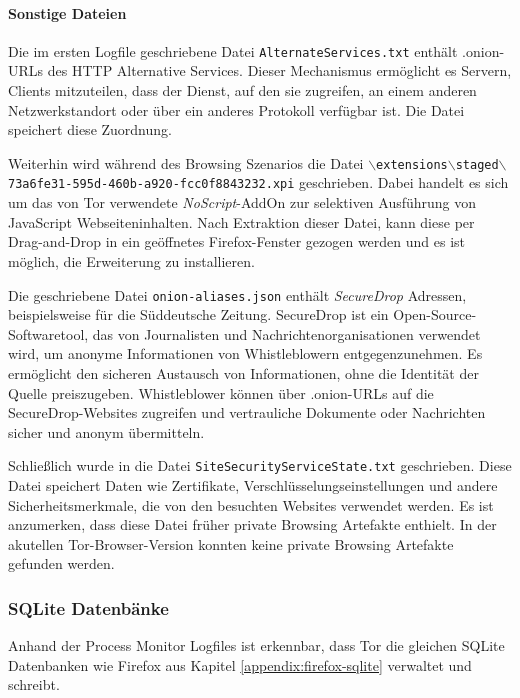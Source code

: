 \begin{appendices}
\paragraph*{Sonstige Dateien}
Die im ersten Logfile geschriebene Datei \texttt{AlternateServices.txt}
enthält .onion-URLs des HTTP Alternative Services. Dieser Mechanismus ermöglicht es Servern, Clients mitzuteilen, dass der Dienst, auf den sie zugreifen, an einem anderen Netzwerkstandort oder über ein anderes Protokoll verfügbar ist. Die Datei speichert diese Zuordnung. \cite{MozillaSupport.26.10.2020}

Weiterhin wird während des Browsing Szenarios die Datei \texttt{$\backslash$extensions$\backslash$staged$\backslash${73a6fe31-595d-460b-a920-fcc0f8843232}.xpi} geschrieben. Dabei handelt es sich um das von Tor verwendete \textit{NoScript}-AddOn zur selektiven Ausführung von JavaScript Webseiteninhalten.
Nach Extraktion dieser Datei, kann diese per Drag-and-Drop in ein geöffnetes Firefox-Fenster gezogen werden und es ist möglich, die Erweiterung zu installieren.

Die geschriebene Datei \texttt{onion-aliases.json} enthält \textit{SecureDrop} Adressen, beispielsweise für die Süddeutsche Zeitung. 
SecureDrop ist ein Open-Source-Softwaretool, das von Journalisten und Nachrichtenorganisationen verwendet wird, um anonyme Informationen von Whistleblowern entgegenzunehmen. Es ermöglicht den sicheren Austausch von Informationen, ohne die Identität der Quelle preiszugeben. Whistleblower können über .onion-URLs auf die SecureDrop-Websites zugreifen und vertrauliche Dokumente oder Nachrichten sicher und anonym übermitteln. \cite{SecureDrop.05.06.2023}

Schließlich wurde in die Datei \texttt{SiteSecurityServiceState.txt} geschrieben.
Diese Datei speichert Daten wie Zertifikate, Verschlüsselungseinstellungen und andere Sicherheitsmerkmale, die von den besuchten Websites verwendet werden.
Es ist anzumerken, dass diese Datei früher private Browsing Artefakte enthielt. \cite{Gitlab.05.06.2023} In der akutellen Tor-Browser-Version konnten keine private Browsing Artefakte gefunden werden.
	
\subsubsection*{SQLite Datenbänke} 
Anhand der Process Monitor Logfiles ist erkennbar, dass Tor die gleichen SQLite Datenbanken wie Firefox aus Kapitel \ref{appendix:firefox-sqlite} verwaltet und schreibt.
			

\end{appendices}
